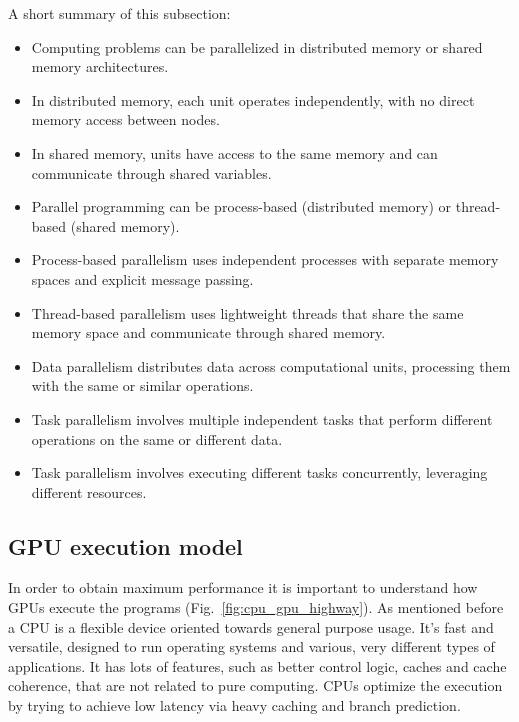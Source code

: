 \par
A short summary of this subsection:
\begin{itemize}
    \item Computing problems can be parallelized in distributed memory or shared memory architectures.
    \item In distributed memory, each unit operates independently, with no direct memory access between nodes.
    \item In shared memory, units have access to the same memory and can communicate through shared variables.
    \item Parallel programming can be process-based (distributed memory) or thread-based (shared memory).
    \item Process-based parallelism uses independent processes with separate memory spaces and explicit message passing.
    \item Thread-based parallelism uses lightweight threads that share the same memory space and communicate through shared memory.
    \item Data parallelism distributes data across computational units, processing them with the same or similar operations.
    \item Task parallelism involves multiple independent tasks that perform different operations on the same or different data.
    \item Task parallelism involves executing different tasks concurrently, leveraging different resources.
\end{itemize}




\subsection{GPU execution model}


\par
In order to obtain maximum performance it is important to understand how GPUs execute the programs (Fig.~\ref{fig:cpu_gpu_highway}).
As mentioned before a CPU is a flexible device oriented towards general purpose usage.
It’s fast and versatile, designed to run operating systems and various, very different types of applications.
It has lots of features, such as better control logic, caches and cache coherence, that are not related to pure computing.
CPUs optimize the execution by trying to achieve low latency via heavy caching and branch prediction.


